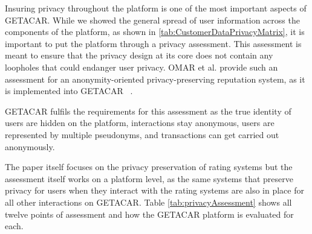 Insuring privacy throughout the platform is one of the most important aspects of GETACAR. While we showed the general spread of user information across the components of the platform, as shown in \ref{tab:CustomerDataPrivacyMatrix}, it is important to put the platform through a privacy assessment. This assessment is meant to ensure that the privacy design at its core does not contain any loopholes that could endanger user privacy. OMAR et al. provide such an assessment for an anonymity-oriented privacy-preserving reputation system, as it is implemented into GETACAR ~\cite{HasanOmar}.

GETACAR fulfils the requirements for this assessment as the true identity of users are hidden on the platform, interactions stay anonymous, users are represented by multiple pseudonyms, and transactions can get carried out anonymously. 

The paper itself focuses on the privacy preservation of rating systems but the assessment itself works on a platform level, as the same systems that preserve privacy for users when they interact with the rating systems are also in place for all other interactions on GETACAR. Table \ref{tab:privacyAssessment} shows all twelve  points of assessment and how the GETACAR platform is evaluated for each.


